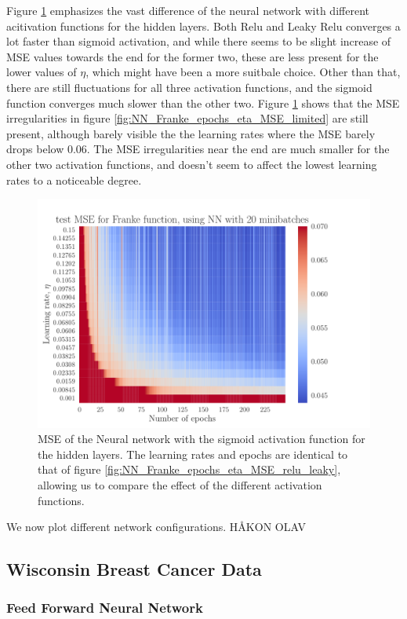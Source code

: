 \documentclass[12pt]{extarticle}
\begin{document}
Figure \ref{fig:NN_Franke_epochs_eta_MSE_sigmoid_compare} emphasizes the vast difference of the neural network with different acitivation functions for the hidden layers. Both Relu and Leaky Relu converges a lot faster than sigmoid activation, and while there seems to be slight increase of MSE values towards the end for the former two, these are less present for the lower values of $\eta$, which might have been a more suitbale choice. Other than that, there are still fluctuations for all three activation functions, and the sigmoid function converges much slower than the other two. Figure \ref{fig:NN_Franke_epochs_eta_MSE_sigmoid_compare} shows that the MSE irregularities in figure \ref{fig:NN_Franke_epochs_eta_MSE_limited} are still present, although barely visible the the learning rates where the MSE barely drops below $0.06$. The MSE irregularities near the end are much smaller for the other two activation functions, and doesn't seem to affect the lowest learning rates to a noticeable degree.

\begin{figure}[h!]
	\includegraphics[width=0.7\linewidth]{NN_Franke/NN_Franke__epochs_eta__test_MSE__compare__600255.pdf}
	\caption{MSE of the Neural network with the sigmoid activation function for the hidden layers. The learning rates and epochs are identical to that of figure \ref{fig:NN_Franke_epochs_eta_MSE_relu_leaky}, allowing us to compare the effect of the different activation functions.}
	\label{fig:NN_Franke_epochs_eta_MSE_sigmoid_compare}
\end{figure}

We now plot different network configurations. HÅKON OLAV

\subsection{Wisconsin Breast Cancer Data}
\subsubsection{Feed Forward Neural Network}
\clearpage
\end{document}

